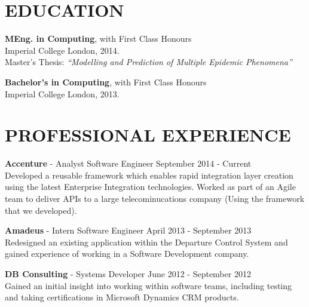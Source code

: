 \documentclass[margin, 10pt]{res} %
\begin{document}
\begin{resume}

\section{EDUCATION}

\textbf{MEng. in Computing}, with First Class Honours \\
Imperial College London, 2014. \\
Master’s Thesis: \textit{``Modelling and Prediction of Multiple Epidemic Phenomena''}

\textbf{Bachelor's in Computing}, with First Class Honours \\
Imperial College London, 2013. \\                                  

 
\section{PROFESSIONAL EXPERIENCE}

\textbf{Accenture} - Analyst Software Engineer \hfill September 2014 - Current \\
Developed a reusable framework which enables rapid integration layer creation using the latest Enterprise Integration technologies.
Worked as part of an Agile team to deliver APIs to a large telecominucations company (Using the framework that we developed).
 
\textbf{Amadeus} - Intern Software Engineer \hfill April 2013 - September 2013 \\
Redesigned an existing application within the Departure Control System and gained experience of working in a Software Development company.

\textbf{DB Consulting} - Systems Developer \hfill June 2012 - September 2012 \\
Gained an initial insight into working within software teams, including testing and taking certifications in Microsoft Dynamics CRM products. \\




\end{resume}
\end{document}
